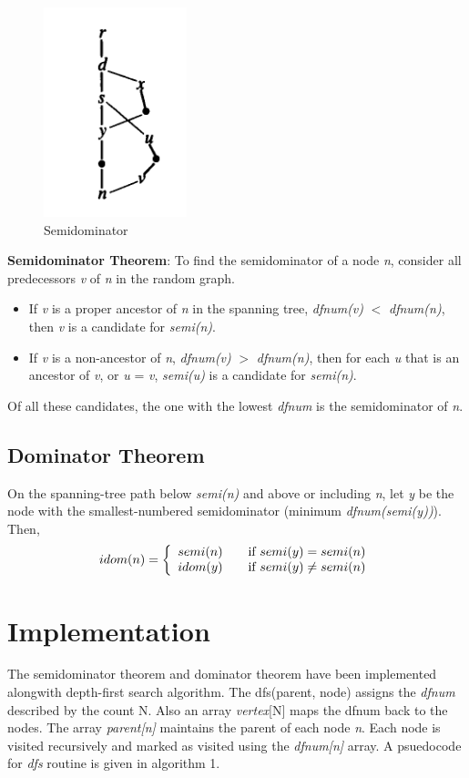 \documentclass[10pt, oneside, a4paper]{article}
\begin{document}
\begin{figure}[htb]
\begin{center}
\ifpdf
	\includegraphics[scale=0.50]{./semidom.png}
\else
\fi
\caption{Semidominator}
\label{fig:1}
\end{center}
\end{figure}

\textbf{Semidominator Theorem}: To find the semidominator of a node \emph{n}, consider all predecessors \emph{v} of \emph{n} in the random graph.
\begin{itemize}
\item If \emph{v} is a proper ancestor of \emph{n} in the spanning tree, \emph{dfnum(v)} $<$ \emph{dfnum(n)}, then \emph{v} is a candidate for \emph{semi(n)}.
\item If \emph{v} is a non-ancestor of \emph{n}, \emph{dfnum(v)} $>$ \emph{dfnum(n)}, then for each \emph{u} that is an ancestor of \emph{v}, or \emph{u} = \emph{v}, \emph{semi(u)} is a candidate for \emph{semi(n)}.
\end{itemize}
Of all these candidates, the one with the lowest \emph{dfnum} is the semidominator of \emph{n}.

\subsection{Dominator Theorem}
On the spanning-tree path below \emph{semi(n)} and above or including \emph{n}, let \emph{y} be the node with the smallest-numbered semidominator (minimum \emph{dfnum(semi(y))}).  Then,
\[
idom(n) = \left\{
\begin{array}{l l}
  semi(n) & \quad \text{if $semi(y) = semi(n)$}\\
  idom(y) & \quad \text{if $semi(y) \neq semi(n)$}\\
\end{array} \right.
\]

\section{Implementation}
The semidominator theorem and dominator theorem have been implemented alongwith depth-first search algorithm.  The dfs(parent, node) assigns the \emph{dfnum} described by the count N.  Also an array \emph{vertex}[N] maps the dfnum back to the nodes.  The array \emph{parent[n]} maintains the parent of each node \emph{n}.  Each node is visited recursively and marked as visited using the \emph{dfnum[n]} array.  A psuedocode for \emph{dfs} routine is given in algorithm 1.
\end{document}
